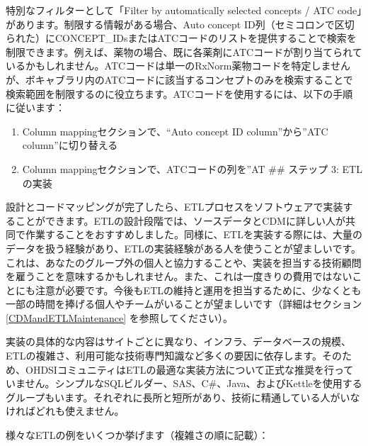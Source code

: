 \documentclass[
  11pt]{book}
\providecommand{\tightlist}{%
  \setlength{\itemsep}{0pt}\setlength{\parskip}{0pt}}
\theoremstyle{definition}
\theoremstyle{definition}
\theoremstyle{definition}
\theoremstyle{definition}
\theoremstyle{remark}
\begin{document}
特別なフィルターとして「Filter by automatically selected concepts / ATC code」があります。制限する情報がある場合、Auto concept ID列（セミコロンで区切られた）にCONCEPT\_IDsまたはATCコードのリストを提供することで検索を制限できます。例えば、薬物の場合、既に各薬剤にATCコードが割り当てられているかもしれません。ATCコードは単一のRxNorm薬物コードを特定しませんが、ボキャブラリ内のATCコードに該当するコンセプトのみを検索することで検索範囲を制限するのに役立ちます。ATCコードを使用するには、以下の手順に従います：

\begin{enumerate}
\def\labelenumi{\arabic{enumi}.}
\tightlist
\item
  Column mappingセクションで、``Auto concept ID column''から''ATC column''に切り替える
\item
  Column mappingセクションで、ATCコードの列を''AT
  \#\# ステップ 3: ETLの実装
\end{enumerate}

設計とコードマッピングが完了したら、ETLプロセスをソフトウェアで実装することができます。ETLの設計段階では、ソースデータとCDMに詳しい人が共同で作業することをおすすめしました。同様に、ETLを実装する際には、大量のデータを扱う経験があり、ETLの実装経験がある人を使うことが望ましいです。これは、あなたのグループ外の個人と協力することや、実装を担当する技術顧問を雇うことを意味するかもしれません。また、これは一度きりの費用ではないことにも注意が必要です。今後もETLの維持と運用を担当するために、少なくとも一部の時間を捧げる個人やチームがいることが望ましいです（詳細はセクション \ref{CDMandETLMaintenance} を参照してください）。

実装の具体的な内容はサイトごとに異なり、インフラ、データベースの規模、ETLの複雑さ、利用可能な技術専門知識など多くの要因に依存します。そのため、OHDSIコミュニティはETLの最適な実装方法について正式な推奨を行っていません。シンプルなSQLビルダー、SAS、C\#、Java、およびKettleを使用するグループもいます。それぞれに長所と短所があり、技術に精通している人がいなければどれも使えません。

様々なETLの例をいくつか挙げます（複雑さの順に記載）：
\end{document}
